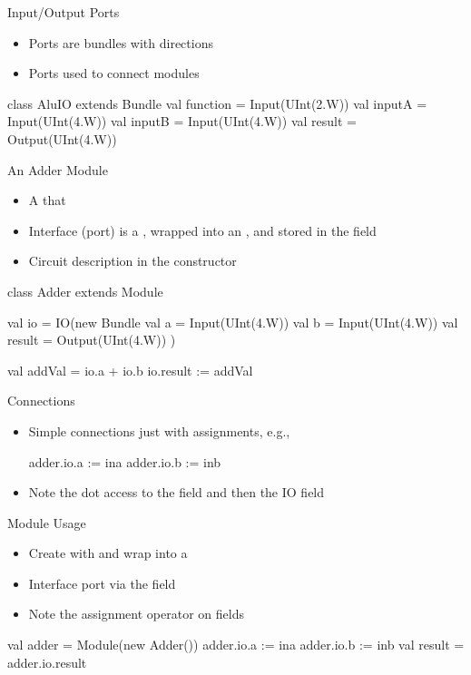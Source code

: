 \begin{frame}[fragile]{Input/Output Ports}
\begin{itemize}
\item Ports are bundles with directions
\item Ports used to connect modules
\end{itemize}
\begin{chisel}
class AluIO extends Bundle {
  val function = Input(UInt(2.W))
  val inputA = Input(UInt(4.W))
  val inputB = Input(UInt(4.W))
  val result = Output(UInt(4.W))
}
\end{chisel}
\end{frame}


\begin{frame}[fragile]{An Adder Module}
\begin{itemize}
\item A  that  
\item Interface (port) is a , wrapped into an , and stored in the field 
\item Circuit description in the constructor
\end{itemize}
\begin{chisel}
class Adder extends Module {
  val io = IO(new Bundle {
    val a = Input(UInt(4.W))
    val b = Input(UInt(4.W))
    val result = Output(UInt(4.W))
  })

  val addVal = io.a + io.b
  io.result := addVal
}
\end{chisel}
\end{frame}

\begin{frame}[fragile]{Connections}
\begin{itemize}
\item Simple connections just with assignments, e.g.,
\begin{chisel}
  adder.io.a := ina
  adder.io.b := inb
\end{chisel}
\item Note the dot access to the field  and then the IO field
\end{itemize}
\end{frame}



\begin{frame}[fragile]{Module Usage}
\begin{itemize}
\item Create with  and wrap into a 
\item Interface port via the  field
\item Note the assignment operator \code{:=} on  fields
\end{itemize}
\begin{chisel}
  val adder = Module(new Adder())
  adder.io.a := ina
  adder.io.b := inb
  val result = adder.io.result
\end{chisel}
\end{frame}

